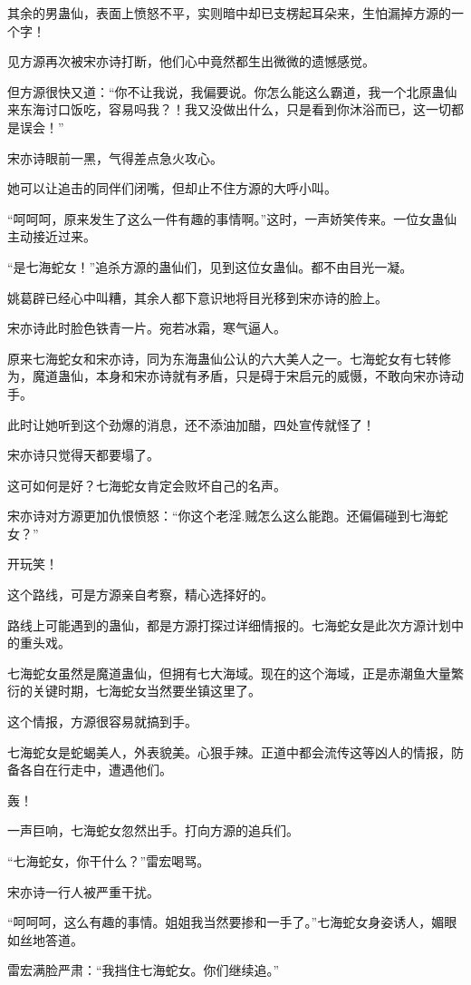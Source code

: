 \begin{this_body}
其余的男蛊仙，表面上愤怒不平，实则暗中却已支楞起耳朵来，生怕漏掉方源的一个字！

见方源再次被宋亦诗打断，他们心中竟然都生出微微的遗憾感觉。

但方源很快又道：“你不让我说，我偏要说。你怎么能这么霸道，我一个北原蛊仙来东海讨口饭吃，容易吗我？！我又没做出什么，只是看到你沐浴而已，这一切都是误会！”

宋亦诗眼前一黑，气得差点急火攻心。

她可以让追击的同伴们闭嘴，但却止不住方源的大呼小叫。

“呵呵呵，原来发生了这么一件有趣的事情啊。”这时，一声娇笑传来。一位女蛊仙主动接近过来。

“是七海蛇女！”追杀方源的蛊仙们，见到这位女蛊仙。都不由目光一凝。

姚葛辟已经心中叫糟，其余人都下意识地将目光移到宋亦诗的脸上。

宋亦诗此时脸色铁青一片。宛若冰霜，寒气逼人。

原来七海蛇女和宋亦诗，同为东海蛊仙公认的六大美人之一。七海蛇女有七转修为，魔道蛊仙，本身和宋亦诗就有矛盾，只是碍于宋启元的威慑，不敢向宋亦诗动手。

此时让她听到这个劲爆的消息，还不添油加醋，四处宣传就怪了！

宋亦诗只觉得天都要塌了。

这可如何是好？七海蛇女肯定会败坏自己的名声。

宋亦诗对方源更加仇恨愤怒：“你这个老淫.贼怎么这么能跑。还偏偏碰到七海蛇女？”

开玩笑！

这个路线，可是方源亲自考察，精心选择好的。

路线上可能遇到的蛊仙，都是方源打探过详细情报的。七海蛇女是此次方源计划中的重头戏。

七海蛇女虽然是魔道蛊仙，但拥有七大海域。现在的这个海域，正是赤潮鱼大量繁衍的关键时期，七海蛇女当然要坐镇这里了。

这个情报，方源很容易就搞到手。

七海蛇女是蛇蝎美人，外表貌美。心狠手辣。正道中都会流传这等凶人的情报，防备各自在行走中，遭遇他们。

轰！

一声巨响，七海蛇女忽然出手。打向方源的追兵们。

“七海蛇女，你干什么？”雷宏喝骂。

宋亦诗一行人被严重干扰。

“呵呵呵，这么有趣的事情。姐姐我当然要掺和一手了。”七海蛇女身姿诱人，媚眼如丝地答道。

雷宏满脸严肃：“我挡住七海蛇女。你们继续追。”


\end{this_body}

